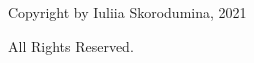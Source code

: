 
\setcounter{page}{2}

\singlespacing

\vspace*{\fill}
\begin{center}

\textcopyright Copyright by Iuliia Skorodumina, 2021

All Rights Reserved.

\vspace{2.5\baselineskip}
\end{center}
